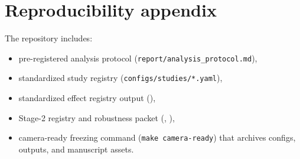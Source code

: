 \documentclass[11pt]{article}
\begin{document}
\section{Reproducibility appendix}
The repository includes:
\begin{itemize}
    \item pre-registered analysis protocol (\texttt{report/analysis\_protocol.md}),
    \item standardized study registry (\texttt{configs/studies/*.yaml}),
    \item standardized effect registry output (),
    \item Stage-2 registry and robustness packet (, ),
    \item camera-ready freezing command (\texttt{make camera-ready}) that archives configs, outputs, and manuscript assets.
\end{itemize}
\end{document}
